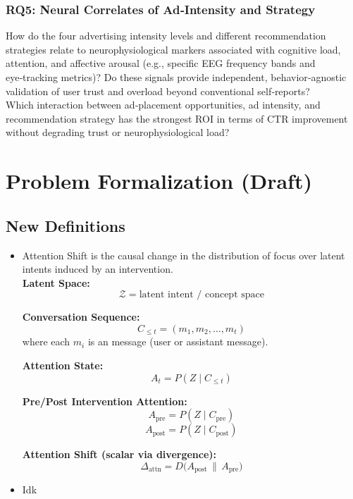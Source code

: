 \documentclass{article}
\begin{document}
\subsubsection{RQ5: Neural Correlates of Ad‑Intensity and Strategy}

How do the four advertising intensity levels and different recommendation strategies relate to neurophysiological markers associated with cognitive load, attention, and affective arousal (e.g., specific EEG frequency bands and eye‑tracking metrics)? Do these signals provide independent, behavior‑agnostic validation of user trust and overload beyond conventional self‑reports?
\\ 

Which interaction between ad‑placement opportunities, ad intensity, and recommendation strategy has the strongest ROI in terms of CTR improvement without degrading trust or neurophysiological load?




\newpage 

\section{Problem Formalization (Draft)}

\subsection{New Definitions}

\begin{itemize}
    \item  Attention Shift is the causal change in the distribution of focus over latent intents induced by an intervention.
    \\ 
            
        \textbf{Latent Space:}
        \[
        \mathcal{Z} = \text{latent intent / concept space}
        \]
        
        \textbf{Conversation Sequence:}
        \[
        C_{\leq t} = (m_1, m_2, \dots, m_t)
        \]
        where each \(m_i\) is an message (user or assistant message).
        
        \textbf{Attention State:}
        \[
        A_t = P(Z \mid C_{\leq t})
        \]
        
        \textbf{Pre/Post Intervention Attention:}
        \[
        A_{\text{pre}} = P(Z \mid C_{\text{pre}})
        \]
        \[
        A_{\text{post}} = P(Z \mid C_{\text{post}})
        \]
        
        \textbf{Attention Shift (scalar via divergence):}
        \[
        \Delta_{\text{attn}} = D\big(A_{\text{post}} \,\|\, A_{\text{pre}}\big)
        \]
    \item Idk

\end{itemize}
\end{document}
